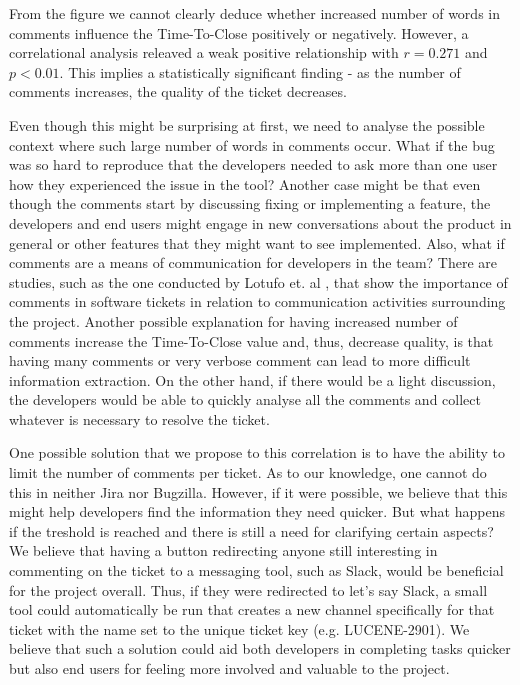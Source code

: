 \documentclass{mpaper}
\begin{document}
From the figure we cannot clearly deduce whether increased number of words in comments influence 
the Time-To-Close positively or negatively. However, a correlational analysis releaved a weak 
positive relationship with $r = 0.271$ and $p < 0.01$. This implies a statistically significant finding - 
as the number of comments increases, the quality of the ticket decreases. 

Even though this might be surprising at first, we need to analyse the possible context where such large 
number of words in comments occur. What if the bug was so hard to reproduce that the developers needed to 
ask more than one user how they experienced the issue in the tool? Another case might be that even though 
the comments start by discussing fixing or implementing a feature, the developers and end users might 
engage in new conversations about the product in general or other features that they might want to see 
implemented. Also, what if comments are a means of communication for developers in the team? There are studies, 
such as the one conducted by Lotufo et. al \cite{lotufo2015modelling}, that show the importance of comments 
in software tickets in relation to communication activities surrounding the project. Another possible explanation 
for having increased number of comments increase the Time-To-Close value and, thus, decrease quality, is that 
having many comments or very verbose comment can lead to more difficult information extraction. On the other 
hand, if there would be a light discussion, the developers would be able to quickly analyse all the comments 
and collect whatever is necessary to resolve the ticket.

One possible solution that we propose to this correlation is to have the ability to limit the number of 
comments per ticket. As to our knowledge, one cannot do this in neither Jira nor Bugzilla. However, if it were 
possible, we believe that this might help developers find the information they need quicker. But what happens 
if the treshold is reached and there is still a need for clarifying certain aspects? We believe that having 
a button redirecting anyone still interesting in commenting on the ticket to a messaging tool, such as 
Slack, would be beneficial for the project overall. Thus, if they were redirected to let's say Slack, a small 
tool could automatically be run that creates a new channel specifically for that ticket with the name set 
to the unique ticket key (e.g. LUCENE-2901). We believe that such a solution could aid both developers in 
completing tasks quicker but also end users for feeling more involved and valuable to the project.
\end{document}
